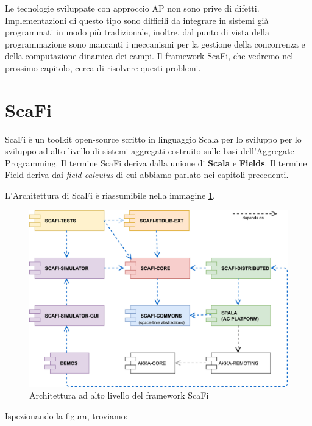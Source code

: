 \documentclass[12pt,a4paper,openright,twoside]{book}
\begin{document}
Le tecnologie sviluppate con approccio \ac{AP} non sono prive di difetti. 
Implementazioni di questo tipo sono difficili da integrare in sistemi già programmati in modo più tradizionale, inoltre, dal punto di vista della programmazione sono mancanti i meccanismi per la gestione della concorrenza e della computazione dinamica dei campi. Il framework ScaFi, che vedremo nel prossimo capitolo, cerca di risolvere questi problemi.


\section{ScaFi}

ScaFi è un toolkit open-source scritto in linguaggio Scala per lo sviluppo per lo sviluppo ad alto livello di sistemi aggregati costruito sulle basi dell'Aggregate Programming.
Il termine ScaFi deriva dalla unione di \textbf{Scala} e \textbf{Fields}. Il termine Field deriva dai \textit{field calculus} di cui abbiamo parlato nei capitoli precedenti.

L'Architettura di ScaFi \cite{Casadei2022} è riassumibile nella immagine \cref{fig:scafi-arc}.

\begin{figure}
    \centering
    \includegraphics[width=.8\linewidth]{figures/scafi-arc.jpg}
    \caption{Architettura ad alto livello del framework ScaFi}
    \label{fig:scafi-arc}
\end{figure}

Ispezionando la figura, troviamo:
\end{document}
